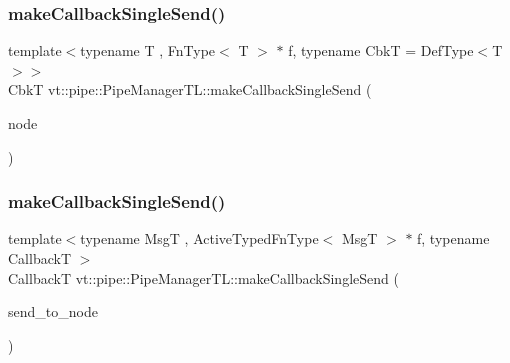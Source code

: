\subsubsection{\texorpdfstring{make\+Callback\+Single\+Send()}{makeCallbackSingleSend()}\hspace{0.1cm}{\footnotesize\ttfamily [1/2]}}
{\footnotesize\ttfamily template$<$typename T , Fn\+Type$<$ T $>$ $\ast$ f, typename CbkT  = Def\+Type$<$\+T$>$$>$ \\
CbkT vt\+::pipe\+::\+Pipe\+Manager\+T\+L\+::make\+Callback\+Single\+Send (\begin{DoxyParamCaption}\item[{\hyperlink{namespacevt_a866da9d0efc19c0a1ce79e9e492f47e2}{Node\+Type} const \&}]{node }\end{DoxyParamCaption})}

\mbox{\label{structvt_1_1pipe_1_1_pipe_manager_t_l_ab160500f39018d96e56743095a1869e8}} 
\subsubsection{\texorpdfstring{make\+Callback\+Single\+Send()}{makeCallbackSingleSend()}\hspace{0.1cm}{\footnotesize\ttfamily [2/2]}}
{\footnotesize\ttfamily template$<$typename MsgT , Active\+Typed\+Fn\+Type$<$ Msg\+T $>$ $\ast$ f, typename CallbackT $>$ \\
CallbackT vt\+::pipe\+::\+Pipe\+Manager\+T\+L\+::make\+Callback\+Single\+Send (\begin{DoxyParamCaption}\item[{\hyperlink{namespacevt_a866da9d0efc19c0a1ce79e9e492f47e2}{Node\+Type} const \&}]{send\+\_\+to\+\_\+node }\end{DoxyParamCaption})}

\mbox{\label{structvt_1_1pipe_1_1_pipe_manager_t_l_aff917693da92fdfb5b275c7cf61e5e8b}} 

